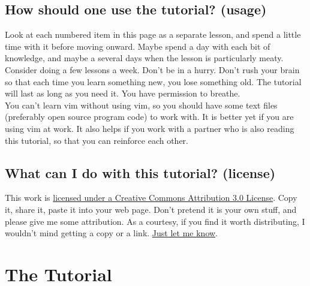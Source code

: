 \documentclass[a4paper, 12pt]{article}
\begin{document}
\subsection{How should one use the tutorial? (usage)}
\label{"How should one use the tutorial? (usage)"}
Look at each numbered item in this page as a separate lesson, and spend a little time with it before moving onward. Maybe spend a day with each bit of knowledge, and maybe a several days when the lesson is particularly meaty.\\
Consider doing a few lessons a week. Don't be in a hurry. Don't rush your brain so that each time you learn something new, you lose something old. The tutorial will last as long as you need it. You have permission to breathe.\\
You can't learn vim without using vim, so you should have some text files (preferably open source program code) to work with. It is better yet if you are using vim at work. It also helps if you work with a partner who is also reading this tutorial, so that you can reinforce each other.\\
\subsection{What can I do with this tutorial? (license)}
\label{"What can I do with this tutorial? (license)"}
This work is \href{http://creativecommons.org/licenses/by/3.0/}{licensed under a Creative Commons Attribution 3.0 License}. Copy it, share it, paste it into your web page. Don't pretend it is your own stuff, and please give me some attribution. As a courtesy, if you find it worth distributing, I wouldn't mind getting a copy or a link. \href{mailto:tottinge@gmail.com}{Just let me know}.
\section{The Tutorial}
\label{"The Tutorial"}
\end{document}
